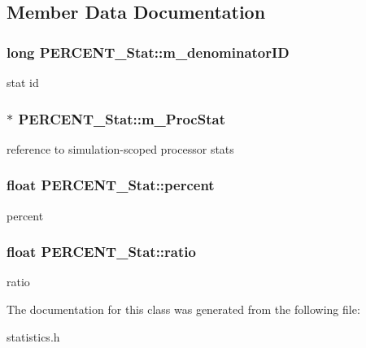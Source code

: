 \subsection{Member Data Documentation}
\hypertarget{classPERCENT__Stat_a0079cc34c77679a78843bf6788e7e4b3}{
\subsubsection[{m\_\-denominatorID}]{\setlength{\rightskip}{0pt plus 5cm}long {\bf PERCENT\_\-Stat::m\_\-denominatorID}}}
\label{classPERCENT__Stat_a0079cc34c77679a78843bf6788e7e4b3}
stat id \hypertarget{classPERCENT__Stat_aaa7e252b1f03c04d1f16b78f360cc601}{
\subsubsection[{m\_\-ProcStat}]{$\ast$ {\bf PERCENT\_\-Stat::m\_\-ProcStat}}}
\label{classPERCENT__Stat_aaa7e252b1f03c04d1f16b78f360cc601}
reference to simulation-\/scoped processor stats \hypertarget{classPERCENT__Stat_a51c6f05b501728724644b0a831abd1eb}{
\subsubsection[{percent}]{\setlength{\rightskip}{0pt plus 5cm}float {\bf PERCENT\_\-Stat::percent}}}
\label{classPERCENT__Stat_a51c6f05b501728724644b0a831abd1eb}
percent \hypertarget{classPERCENT__Stat_acceb28a0ccaf48ba31b576c0f88b1303}{
\subsubsection[{ratio}]{\setlength{\rightskip}{0pt plus 5cm}float {\bf PERCENT\_\-Stat::ratio}}}
\label{classPERCENT__Stat_acceb28a0ccaf48ba31b576c0f88b1303}
ratio 

The documentation for this class was generated from the following file:\begin{DoxyCompactItemize}
\item 
statistics.h\end{DoxyCompactItemize}
